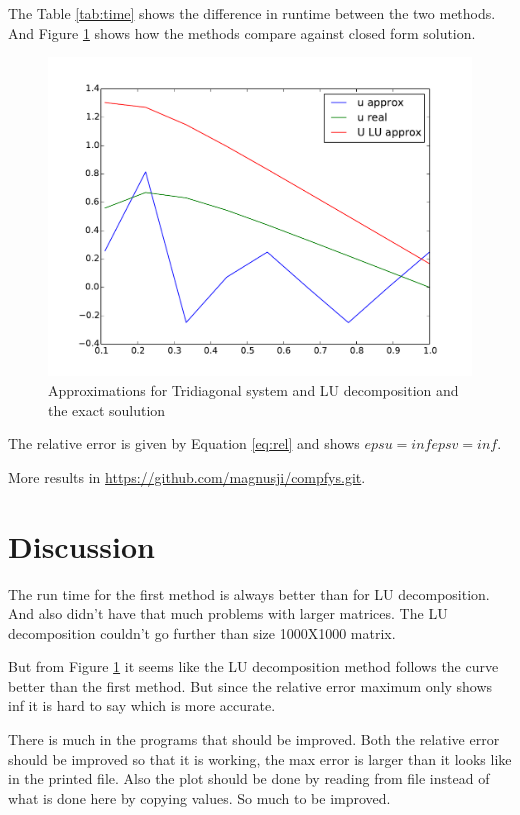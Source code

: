 \documentclass[12pt]{article}
\begin{document}
The Table \ref{tab:time} shows the difference in runtime between the two methods. 
And Figure \ref{fig:app} shows how the methods compare against closed form solution. 


\begin{figure}[hb!]
\includegraphics[width=\textwidth]{./results/figure_10pt.pdf}
\caption{Approximations for Tridiagonal system and LU decomposition and the exact soulution}
\label{fig:app}
\end{figure}

The relative error is given by Equation \ref{eq:rel}
and shows  $epsu = inf epsv = inf$. 

More results in \url{https://github.com/magnusji/compfys.git}. 

\section*{Discussion}

The run time for the first method is always better than for LU decomposition. And also didn't have that much problems with larger matrices. The LU decomposition couldn't go further than size 1000X1000 matrix.

But from Figure \ref{fig:app} it seems like the LU decomposition method follows the curve better than the first method. But since the relative error maximum only shows inf it is hard to say which is more accurate. 

There is much in the programs that should be improved. Both the relative error should be improved so that it is working, the max error is larger than it looks like in the printed file. Also the plot should be done by reading from file instead of what is done here by copying values. So much to be improved.  
\end{document}

